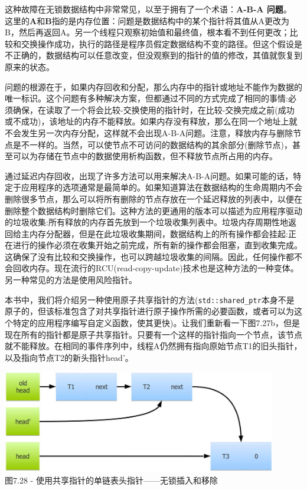 这种故障在无锁数据结构中非常常见，以至于拥有了一个术语：\textbf{A-B-A 问题}。 这里的\textbf{A}和\textbf{B}指的是内存位置：问题是数据结构中的某个指针将其值从A更改为B，然后再返回A。另一个线程只观察初始值和最终值，根本看不到任何更改；比较和交换操作成功，执行的路径是程序员假定数据结构不变的路径。但这个假设是不正确的，数据结构可以任意改变，但没观察到的指针的值的修改，其值就恢复到原来的状态。

问题的根源在于，如果内存回收和分配，那么内存中的指针或地址不能作为数据的唯一标识。这个问题有多种解决方案，但都通过不同的方式完成了相同的事情:必须确保，在读取了一个将会比较-交换使用的指针时，在比较-交换完成之前(成功或不成功)，该地址的内存不能释放。如果内存没有释放，那么在同一个地址上就不会发生另一次内存分配，这样就不会出现A-B-A问题。注意，释放内存与删除节点是不一样的。当然，可以使节点不可访问的数据结构的其余部分(删除节点)，甚至可以为存储在节点中的数据使用析构函数，但不释放节点所占用的内存。

通过延迟内存回收，出现了许多方法可以用来解决A-B-A问题。如果可能的话，特定于应用程序的选项通常是最简单的。如果知道算法在数据结构的生命周期内不会删除很多节点，那么可以将所有删除的节点存放在一个延迟释放的列表中，以便在删除整个数据结构时删除它们。这种方法的更通用的版本可以描述为应用程序驱动的垃圾收集:所有释放的内存首先放到一个垃圾收集列表中。垃圾内存周期性地返回给主内存分配器，但是在此垃圾收集期间，数据结构上的所有操作都会挂起:正在进行的操作必须在收集开始之前完成，所有新的操作都会阻塞，直到收集完成。这确保了没有比较和交换操作，也可以跨越垃圾收集的间隔。因此，任何操作都不会回收内存。现在流行的RCU(read-copy-update)技术也是这种方法的一种变体。另一种常见的方法是使用风险指针。

本书中，我们将介绍另一种使用原子共享指针的方法(\texttt{std::shared\_ptr}本身不是原子的，但该标准包含了对共享指针进行原子操作所需的必要函数，或者可以为这个特定的应用程序编写自定义函数，使其更快)。让我们重新看一下图7.27b，但是现在所有的指针都是原子共享指针。只要有一个这样的指针指向一个节点，该节点就不能释放。在相同的事件序列中，线程A仍然拥有指向原始节点T1的旧头指针，以及指向节点T2的新头指针head'。

\begin{center}
\includegraphics[width=0.9\textwidth]{content/2/chapter7/images/28.jpg}\\
图7.28 - 使用共享指针的单链表头指针——无锁插入和移除
\end{center}

